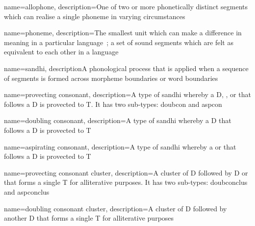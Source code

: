 \usepackage[%
            xindy,
            toc,
            ]{glossaries}
\usepackage{glossary-mcols}

\makeglossaries
\usepackage[xindy]{imakeidx}
\makeindex


%
{
  name=allophone,
  description={One of two or more phonetically distinct segments which can realise a single phoneme in varying circumstances~\autocite[s.v.~\emph{allophone}]{Tra_dictionary96}}
}

%
{
  name=phoneme,
  description={The smallest unit which can make a difference in meaning in a particular language~\autocite[s.v.~\emph{phoneme}]{Tra_dictionary96}; a set of sound segments which are felt as equivalent to each other in a language}
}

%
{
  name=sandhi,
  description{A phonological process that is applied when a sequence of segments is formed across morpheme boundaries or word boundaries~\autocite[s.v.~\emph{sandhi}]{Tra_dictionary96}}
}

{
    name=provecting consonant,
    description={A type of \gls{sandhi} whereby a \gls{D}, , or  that follows a \gls{D} is provected to \gls{T}. It has two sub-types: \gls{doubcon} and \gls{aspcon}}
}

{
    name=doubling consonant,
    description={A type of \gls{sandhi} whereby a \gls{D} that follows a \gls{D} is provected to \gls{T}}
}

{
    name=aspirating consonant,
    description={A type of \gls{sandhi} whereby a  or  that follows a \gls{D} is provected to \gls{T}}
}

{
    name=provecting consonant cluster,
    description={A cluster of \gls{D} followed by \gls{D} or  that forms a single \gls{T} for alliterative purposes. It has two sub-types: \gls{doubconclus} and \gls{aspconclus}}
}

{
    name=doubling consonant cluster,
    description={A cluster of \gls{D} followed by another \gls{D} that forms a single \gls{T} for alliterative purposes}
}

